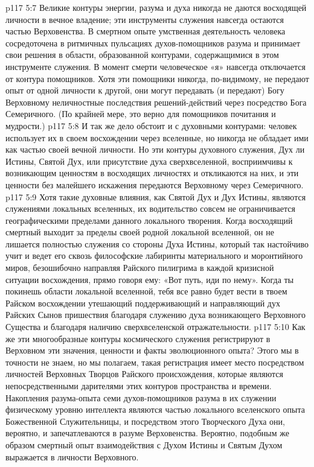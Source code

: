 \vs p117 5:7 Великие контуры энергии, разума и духа никогда не даются восходящей личности в вечное владение; эти инструменты служения навсегда остаются частью Верховенства. В смертном опыте умственная деятельность человека сосредоточена в ритмичных пульсациях духов\hyp{}помощников разума и принимает свои решения в области, образованной контурами, содержащимися в этом инструменте служения. В момент смерти человеческое «я» навсегда отключается от контура помощников. Хотя эти помощники никогда, по\hyp{}видимому, не передают опыт от одной личности к другой, они могут передавать (и передают) Богу Верховному неличностные последствия решений\hyp{}действий через посредство Бога Семеричного. (По крайней мере, это верно для помощников почитания и мудрости.)
\vs p117 5:8 И так же дело обстоит и с духовными контурами: человек использует их в своем восхождении через вселенные, но никогда не обладает ими как частью своей вечной личности. Но эти контуры духовного служения, Дух ли Истины, Святой Дух, или присутствие духа сверхвселенной, восприимчивы к возникающим ценностям в восходящих личностях и откликаются на них, и эти ценности без малейшего искажения передаются Верховному через Семеричного.
\vs p117 5:9 \pc Хотя такие духовные влияния, как Святой Дух и Дух Истины, являются служениями локальных вселенных, их водительство совсем не ограничивается географическими пределами данного локального творения. Когда восходящий смертный выходит за пределы своей родной локальной вселенной, он не лишается полностью служения со стороны Духа Истины, который так настойчиво учит и ведет его сквозь философские лабиринты материального и моронтийного миров, безошибочно направляя Райского пилигрима в каждой кризисной ситуации восхождения, прямо говоря ему: «Вот путь, иди по нему». Когда ты покинешь области локальной вселенной, тебя все равно будет вести в твоем Райском восхождении утешающий поддерживающий и направляющий дух Райских Сынов пришествия благодаря служению духа возникающего Верховного Существа и благодаря наличию сверхвселенской отражательности.
\vs p117 5:10 Как же эти многообразные контуры космического служения регистрируют в Верховном эти значения, ценности и факты эволюционного опыта? Этого мы в точности не знаем, но мы полагаем, такая регистрация имеет место посредством личностей Верховных Творцов Райского происхождения, которые являются непосредственными дарителями этих контуров пространства и времени. Накопления разума\hyp{}опыта семи духов\hyp{}помощников разума в их служении физическому уровню интеллекта являются частью локального вселенского опыта Божественной Служительницы, и посредством этого Творческого Духа они, вероятно, и запечатлеваются в разуме Верховенства. Вероятно, подобным же образом смертный опыт взаимодействия с Духом Истины и Святым Духом выражается в личности Верховного.
